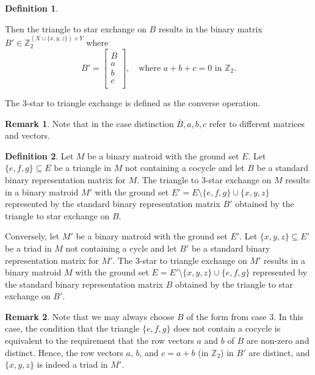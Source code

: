 \documentclass{article}
\theoremstyle{definition}
\newtheorem{definition}{Definition}
\newtheorem{remark}{Remark}
\begin{document}
\begin{definition}
\begin{enumerate}
\[        \]
        Then the triangle to star exchange on $B$ results in the binary matrix $B' \in \mathbb{Z}_{2}^{(X \cup \{x, y, z\}) \times Y}$ where
        \[
            B' = \begin{bmatrix}
                \overline{B} \\
                a \\
                b \\
                c \\
            \end{bmatrix}
            , \quad
            \text{where $a + b + c = 0$ in $\mathbb{Z}_{2}$.}
        \]
    \end{enumerate}
    The 3-star to triangle exchange is defined as the converse operation.
\end{definition}

\begin{remark}
    Note that in the case distinction $\overline{B}, a, b, c$ refer to different matrices and vectors.
\end{remark}

\begin{definition}
    Let $M$ be a binary matroid with the ground set $E$. Let $\{e, f, g\} \subseteq E$ be a triangle in $M$ not containing a cocycle and let $B$ be a standard binary representation matrix for $M$. The triangle to 3-star exchange on $M$ results in a binary matroid $M'$ with the ground set $E' = E \setminus \{e, f, g\} \cup \{x, y, z\}$ represented by the standard binary representation matrix $B'$ obtained by the triangle to star exchange on $B$.

    Conversely, let $M'$ be a binary matroid with the ground set $E'$. Let $\{x, y, z\} \subseteq E'$ be a triad in $M$ not containing a cycle and let $B'$ be a standard binary representation matrix for $M'$. The 3-star to triangle exchange on $M'$ results in a binary matroid $M$ with the ground set $E = E' \setminus \{x, y, z\} \cup \{e, f, g\}$ represented by the standard binary representation matrix $B$ obtained by the triangle to star exchange on $B'$.
\end{definition}

\begin{remark}
    Note that we may always choose $B$ of the form from case 3. In this case, the condition that the triangle $\{e, f, g\}$ does not contain a cocycle is equivalent to the requirement that the row vectors $a$ and $b$ of $B$ are non-zero and distinct. Hence, the row vectors $a$, $b$, and $c = a + b$ (in $\mathbb{Z}_{2}$) in $B'$ are distinct, and $\{x, y, z\}$ is indeed a triad in $M'$.
\end{remark}
\end{document}
